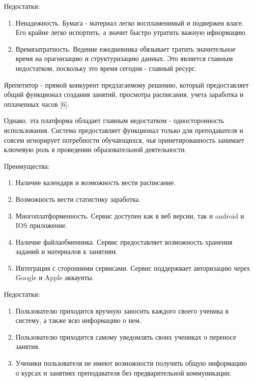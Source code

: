 \documentclass[a4paper,14pt,oneside]{extreport}
\begin{document}
Недостатки:

\begin{enumerate}
    \item Ненадежность. Бумага - материал легко воспламенимый и подвержен влаге. Его крайне легко испортить, а значит быстро утратить важную ифнормацию.
    \item Времязатратность. Ведение ежедневника обязывает тратить значительное время на орагнизацию и структуризацию данных. Это является главным недостатком, поскольку это время сегодня - главный ресурс.
\end{enumerate}


Ярепетитор - прямой конкурент предлагаемому решению, который предоставляет общий функционал создания занятий, просмотра расписания, учета заработка и оплаченных часов [6].

Однако, эта платформа обладает главным недостатком - односторонность использования. Система предоставляет функционал только для преподавателя и совсем игнорирует потребности обучающихся, чья оринетированность занимает ключевую роль в проведении образовательной деятельности.

Преимущества:
\begin{enumerate}
    \item Наличие календаря и возможность вести расписание.
    \item Возможность вести статистику заработка.
    \item Многоплатформенность. Сервис доступен как в веб версии, так и android и IOS приложение.
    \item  Наличие файлаобменника. Сервис предоставляет возможность хранения заданий и материалов к занятиям.
    \item Интеграция с сторонними сервисами. Сервис поддержвает авторизацию черех Google и Apple аккаунты.
\end{enumerate}

Недостатки:
\begin{enumerate}
    \item Пользователю приходится вручную заносить каждого своего ученика в систему, а также всю информацию о нем.
    \item Пользователю приходится самому уведомлять своих учениках о переносе занятия.
    \item Ученики пользователя не имеют возможности получить общую информацию о курсах и занятиях преподавателя без предварительной коммуникации. 
\end{enumerate}
\end{document}
